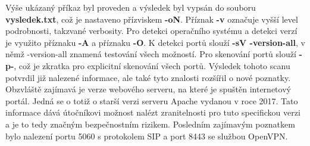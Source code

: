 Výše ukázaný příkaz byl proveden a výsledek byl vypsán do souboru \textbf{vysledek.txt}, což je nastaveno přízviskem \textbf{-oN}.
Příznak \textbf{-v} označuje vyšší level podrobnosti, takzvané verbosity.
Pro detekci operačního systému a detekci verzí je využito příznaku \textbf{-A} a příznaku \textbf{-O}.
K detekci portů slouží \textbf{-sV -version-all}, v němž -version-all znamená testování všech možností.
Pro skenování portů slouží \textbf{-p-}, což je zkratka pro explicitní skenování všech portů.
Výsledek tohoto scanu potvrdil již nalezené informace, ale také tyto znalosti rozšířil o nové poznatky.
Obzvláště zajímavá je verze webového serveru, na které je spuštěn internetový portál.
Jedná se o totiž o starší verzi serveru Apache vydanou v roce 2017.
Tato informace dává útočníkovi možnost nalézt zranitelnosti pro tuto specifickou verzi a je to tedy značným bezpečnostním rizikem.
Posledním zajímavým poznatkem bylo nalezení portu 5060 s protokolem SIP a port 8443 se službou OpenVPN\@.


